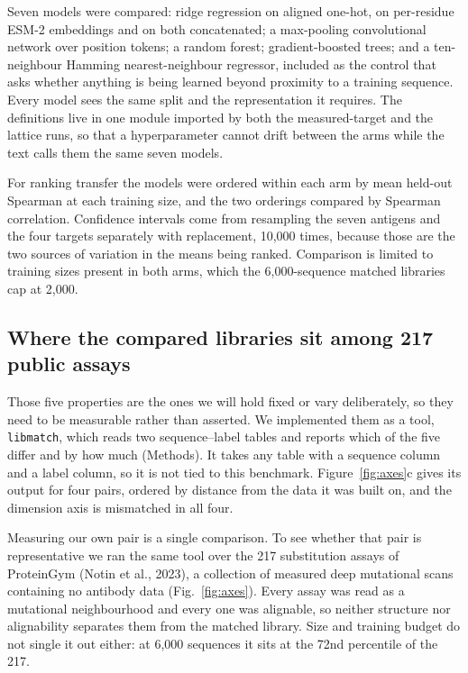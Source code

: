 \documentclass[11pt,a4paper]{article}
\begin{document}
Seven models were compared: ridge regression on aligned one-hot, on per-residue
ESM-2 embeddings and on both concatenated; a max-pooling convolutional network
over position tokens; a random forest; gradient-boosted trees; and a
ten-neighbour Hamming nearest-neighbour regressor, included as the control that
asks whether anything is being learned beyond proximity to a training sequence.
Every model sees the same split and the representation it requires. The
definitions live in one module imported by both the measured-target and the
lattice runs, so that a hyperparameter cannot drift between the arms while the
text calls them the same seven models.

For ranking transfer the models were ordered within each arm by mean held-out
Spearman at each training size, and the two orderings compared by Spearman
correlation. Confidence intervals come from resampling the seven antigens and
the four targets separately with replacement, 10{,}000 times, because those are
the two sources of variation in the means being ranked. Comparison is limited
to training sizes present in both arms, which the 6{,}000-sequence matched
libraries cap at 2{,}000.

\subsection*{Where the compared libraries sit among 217 public assays}

Those five properties are the ones we will hold fixed or vary deliberately, so
they need to be measurable rather than asserted. We implemented them as a tool,
\texttt{libmatch}, which reads two sequence--label tables and reports which of
the five differ and by how much (Methods). It takes any table with a sequence
column and a label column, so it is not tied to this benchmark. Figure~\ref{fig:axes}c
gives its output for four pairs, ordered by distance from the data it was
built on, and the dimension axis is mismatched in all four.

Measuring our own pair is a single comparison. To see whether that pair is
representative we ran the same tool over the 217 substitution assays of
ProteinGym (Notin et al., 2023), a collection of measured deep mutational scans
containing no antibody data (Fig.~\ref{fig:axes}). Every assay was read as a
mutational neighbourhood and every one was alignable, so neither structure nor
alignability separates them from the matched library. Size and training budget
do not single it out either: at 6{,}000 sequences it sits at the 72nd
percentile of the 217.
\end{document}

